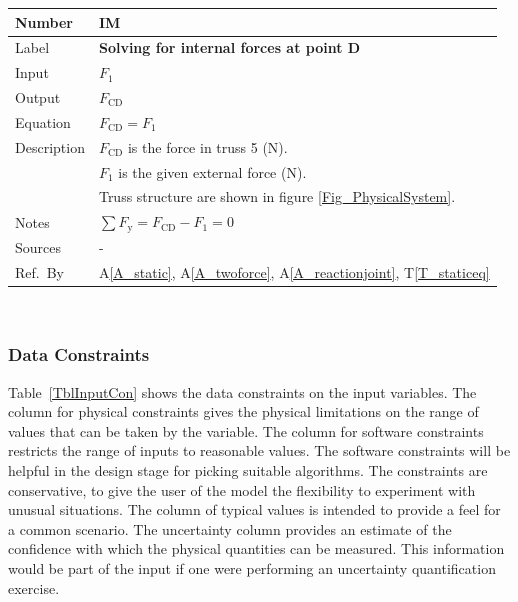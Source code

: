 \documentclass[12pt]{article}
\newcommand{\colAwidth}{0.13\textwidth}
\newcommand{\colBwidth}{0.82\textwidth}
\newcommand{\tref}[1]{T\ref{#1}}
\newcommand{\aref}[1]{A\ref{#1}}
\newcounter{instnum} %
\begin{document}
\noindent
\begin{minipage}{\textwidth}
	\renewcommand*{\arraystretch}{1.5}
	\begin{tabular}{| p{\colAwidth} | p{\colBwidth}|}
		\hline
		\rowcolor[gray]{0.9}
		Number& IM{instnum}\theinstnum \label{I_solveD}\\
		\hline
		Label& \bf Solving for internal forces at point D\\
		\hline
		Input& $F_1$\\
		\hline
		Output& $F_{\text{{CD}}}$ \\
		\hline
		Equation&$F_{\text{{CD}}} = F_1$ \\
		\hline
		Description&$F_{\text{{CD}}}$ is the force in truss 5 (N).\\
		&$F_1$ is the given external force (N).\\
		&Truss structure are shown in figure \ref{Fig_PhysicalSystem}.\\
		\hline
		Notes& $\sum F_{\text{y}} = F_{\text{CD}} - F_1 = 0$\\
		\hline
		Sources& - \\
		\hline
		Ref.\ By & \aref{A_static}, \aref{A_twoforce}, \aref{A_reactionjoint}, 
		\tref{T_staticeq}\\
		\hline
	\end{tabular}
\end{minipage}\\

\subsubsection{Data Constraints} \label{sec_DataConstraints}    

Table~\ref{TblInputCon} shows the data constraints on the input variables.  The 
column for physical constraints gives the physical limitations on the range of 
values that can be taken by the variable. The column for software constraints 
restricts the range of inputs to reasonable values. The software constraints 
will be helpful in the design stage for picking suitable algorithms. The 
constraints are conservative, to give the user of the model the flexibility to 
experiment with unusual situations. The column of typical values is intended to 
provide a feel for a common scenario. The uncertainty column provides an 
estimate of the confidence with which the physical quantities can be measured. 
This information would be part of the input if one were performing an 
uncertainty quantification exercise.
\end{document}
